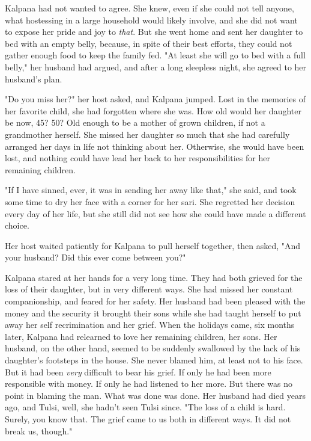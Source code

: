 \documentclass{amsart}
\begin{document}
	Kalpana had not wanted to agree. She knew, even if she could not tell anyone,
	what hostessing in a large household would likely involve, and she did not want
	to expose her pride and joy to \emph{that}. But she went home and sent her
	daughter to bed with an empty belly, because, in spite of their best efforts,
	they could not gather enough food to keep the family fed. "At least she will go
	to bed with a full belly," her husband had argued, and after a long sleepless
	night, she agreed to her husband's plan.
	
	"Do you miss her?" her host asked, and Kalpana jumped. Lost in the memories of her favorite child, she had forgotten where she was. How old would her daughter be now, 45? 50? Old enough to be a mother of grown children, if not a grandmother herself. She missed her daughter so much that she had carefully arranged her days in life not thinking about her. Otherwise, she would have been lost, and nothing could have lead her back to her responsibilities for her remaining children. 
	
	"If I have sinned, ever, it was in sending her away like that," she said, and took some
	time to dry her face with a corner for her sari. She regretted her decision
	every day of her life, but she still did not see how she could have made a
	different choice.
	
	Her host waited patiently for Kalpana to pull herself together, then asked, "And your husband? Did this ever come between you?"
	
	Kalpana stared at her hands for a very long time. They had both grieved for the
	loss of their daughter, but in very different ways. She had missed her constant companionship, and feared for her safety. Her husband had been pleased with the
	money and the security it brought their sons while she had taught herself to put away her self recrimination and her grief. When the holidays came, six months later, Kalpana had relearned to love her remaining children, her sons. Her husband, on the other hand, seemed to be suddenly swallowed by the lack of his daughter's footsteps in the house. She never blamed him, at least not to his face. But it had been \emph{very} difficult to
	bear his grief. If only he had been more responsible with money. If only he had listened to her more. But there was no point in blaming the man. What was done was done. Her husband had died years ago, and Tulsi, well, she hadn't seen Tulsi since. "The loss of a child is hard. Surely, you know that. The grief came to us both in different ways. It did not break us, though."
	
\end{document}
